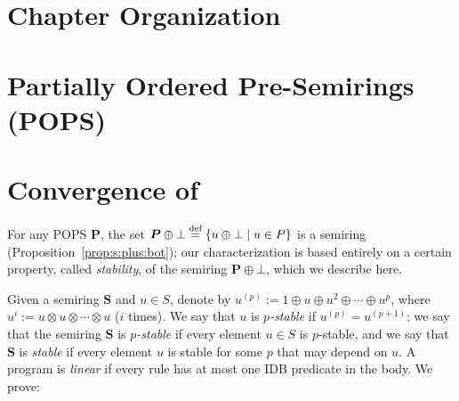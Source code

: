 \section{Chapter Organization}


\section{Partially Ordered Pre-Semirings (POPS)}
\label{sec:pops}

\section{\datalogo}
\label{sec:datalogo}

\section{Convergence of \datalogo}
\label{sec:convergence}

For any POPS $\bm P$, the set
$\bm P \oplus \bot \stackrel{\text{def}}{=} \{{u\oplus \bot}\mid{u \in P}\}$ is a
semiring (Proposition~\ref{prop:s:plus:bot}); our characterization is based entirely on a certain
property, called {\em stability}, of the semiring $\bm P \oplus \bot$,
which we describe here.

Given a semiring $\bm S$ and $u \in S$, denote by
$u^{(p)} := 1 \oplus u \oplus u^2 \oplus \cdots \oplus u^{p}$, where
$u^{i} := u \otimes u \otimes \cdots \otimes u$ ($i$ times).  We say
that $u$ is {\em $p$-stable} if $u^{(p)}=u^{(p+1)}$; we say that the
semiring $\bm S$ is {\em $p$-stable} if every element $u \in S$ is $p$-stable, and
we say that $\bm S$ is {\em stable} if every element $u$ is stable for some
$p$ that may depend on $u$.
A \datalogo program is {\em linear} if every rule has at most one IDB predicate in the body.
We prove:

